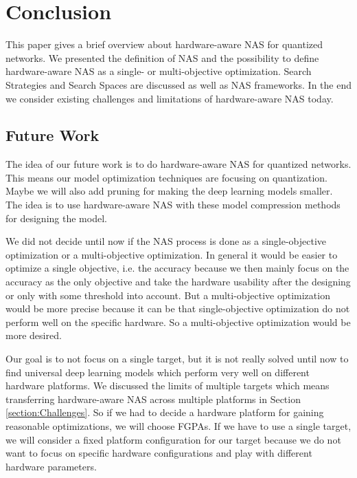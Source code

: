 \documentclass[conference]{IEEEtran}
\begin{document}
\section{Conclusion}

This paper gives a brief overview about hardware-aware NAS for quantized networks. We presented the definition of NAS and the possibility to define hardware-aware NAS as a single- or multi-objective optimization. Search Strategies and Search Spaces are discussed as well as NAS frameworks. In the end we consider existing challenges and limitations of hardware-aware NAS today.

\subsection{Future Work}

The idea of our future work is to do hardware-aware NAS for quantized networks. This means our model optimization techniques are focusing on quantization. Maybe we will also add pruning for making the deep learning models smaller. The idea is to use hardware-aware NAS with these model compression methods for designing the model. 

We did not decide until now if the NAS process is done as a single-objective optimization or a multi-objective optimization. In general it would be easier to optimize a single objective, i.e. the accuracy because we then mainly focus on the accuracy as the only objective and take the hardware usability after the designing or only with some threshold into account. But a multi-objective optimization would be more precise because it can be that single-objective optimization do not perform well on the specific hardware. So a multi-objective optimization would be more desired.

Our goal is to not focus on a single target, but it is not really solved until now to find universal deep learning models which perform very well on different hardware platforms. We discussed the limits of multiple targets which means transferring hardware-aware NAS across multiple platforms in Section \ref{section:Challenges}. So if we had to decide a hardware platform for gaining reasonable optimizations, we will choose FGPAs. If we have to use a single target, we will consider a fixed platform configuration for our target because we do not want to focus on specific hardware configurations and play with different hardware parameters. 
\end{document}
